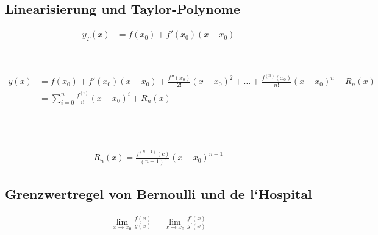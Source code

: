 \subsection{Linearisierung und Taylor-Polynome}

\begin{boxleft}
\end{boxleft}\begin{boxrightshaded}
\begin{align} 
y_T(x)&=f(x_0)+f'(x_0)(x-x_0)
\end{align}\end{boxrightshaded}

\begin{boxleft}
\\
\end{boxleft}\begin{boxrightshaded}
\begin{align} 
y(x)&=f(x_0)+f'(x_0)(x-x_0)+\frac{f''(x_0)}{2!}(x-x_0)^2+\dots+\frac{f^{(n)}(x_0)}{n!}(x-x_0)^n+R_n(x)\\
    &=\sum_{i=0}^n\frac{f^{(i)}}{i!}(x-x_0)^i+R_n(x)
\end{align}\end{boxrightshaded}


\begin{boxleft}
\\
\\
\end{boxleft}\begin{boxrightshaded}
\begin{align} 
R_n(x)=\frac{f^{(n+1)}(c)}{(n+1)!}(x-x_0)^{n+1}
\end{align}\end{boxrightshaded}

\subsection{Grenzwertregel von Bernoulli und de l`Hospital}
\begin{boxleft}
\end{boxleft}\begin{boxrightshaded}
\begin{align} 
 \lim_{x \to x_0}\frac{f(x)}{g(x)}=\lim_{x \to x_0}\frac{f'(x)}{g'(x)}
\end{align}\end{boxrightshaded}


